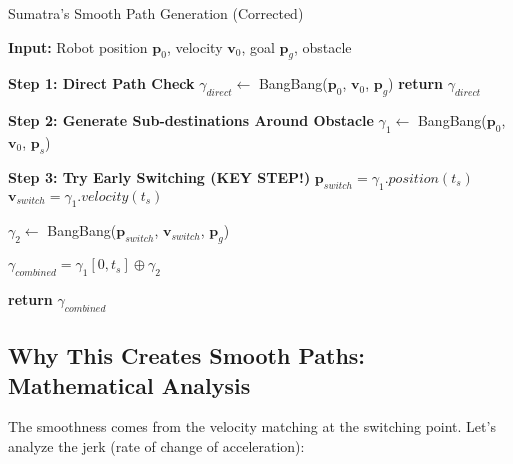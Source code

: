 \documentclass[12pt,a4paper]{article}
\begin{document}
\begin{algorithm}
\caption{Sumatra's Smooth Path Generation (Corrected)}
\begin{algorithmic}
\STATE \textbf{Input:} Robot position $\mathbf{p}_0$, velocity $\mathbf{v}_0$, goal $\mathbf{p}_g$, obstacle

\STATE \textbf{Step 1: Direct Path Check}
\STATE $\gamma_{direct} \gets$ BangBang($\mathbf{p}_0$, $\mathbf{v}_0$, $\mathbf{p}_g$)
    \STATE \textbf{return} $\gamma_{direct}$
\ENDIF

\STATE \textbf{Step 2: Generate Sub-destinations Around Obstacle}
    \STATE $\gamma_1 \gets$ BangBang($\mathbf{p}_0$, $\mathbf{v}_0$, $\mathbf{p}_s$)
    
    \STATE \textbf{Step 3: Try Early Switching (KEY STEP!)}
        \STATE {}
        \STATE $\mathbf{p}_{switch} = \gamma_1.position(t_s)$
        \STATE $\mathbf{v}_{switch} = \gamma_1.velocity(t_s)$ 
        
        \STATE {}
        \STATE $\gamma_2 \gets$ BangBang($\mathbf{p}_{switch}$, $\mathbf{v}_{switch}$, $\mathbf{p}_g$)
        
        \STATE {}
        \STATE $\gamma_{combined} = \gamma_1[0, t_s] \oplus \gamma_2$
        
            \STATE \textbf{return} $\gamma_{combined}$
        \ENDIF
    \ENDFOR
\ENDFOR
\end{algorithmic}
\end{algorithm}

\subsection{Why This Creates Smooth Paths: Mathematical Analysis}

The smoothness comes from the velocity matching at the switching point. Let's analyze the jerk (rate of change of acceleration):
\end{document}
